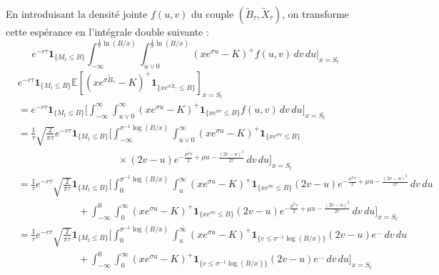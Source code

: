 \documentclass[11pt]{article}
\begin{document}
En introduisant la densité jointe $f(u, v)$ du couple $(\tilde{B}_\tau, \tilde{X}_\tau)$, on transforme cette espérance en l'intégrale double suivante :
\begin{equation}
e^{-r\tau} \mathbf{1}_{\{M_t \le B\}} \int_{-\infty}^{\frac{1}{\sigma} \ln(B/x)} \int_{u \vee 0}^{\frac{1}{\sigma} \ln(B/x)} (x e^{\sigma u} - K)^+ f(u, v) \, dv \, du \Bigg|_{x=S_t}
\end{equation}
\begin{align*}
& e^{-r\tau} \mathbf{1}_{\{M_t \le B\}} \mathbb{E} \left[ \left( x e^{\sigma \tilde{B}_\tau} - K \right)^+ \mathbf{1}_{\{ x e^{\sigma \tilde{X}_\tau} \le B \}} \right]_{x=S_t} \\
&= e^{-r\tau} \mathbf{1}_{\{M_t \le B\}} \Bigg[ \int_{-\infty}^{\infty} \int_{u \vee 0}^{\infty} (x e^{\sigma u} - K)^+ \mathbf{1}_{\{x e^{\sigma v} \le B\}} f(u, v) \, dv \, du \Bigg]_{x=S_t} \\
&= \frac{1}{\tau} \sqrt{\frac{2}{\pi\tau}} e^{-r\tau} \mathbf{1}_{\{M_t \le B\}} \Bigg[ \int_{-\infty}^{\sigma^{-1}\log(B/x)} \int_{u \vee 0}^{\infty} (x e^{\sigma u} - K)^+ \mathbf{1}_{\{x e^{\sigma v} \le B\}} \\
&\qquad \qquad \qquad \qquad \qquad \times (2v - u) e^{-\frac{\mu^2\tau}{2} + \mu u - \frac{(2v-u)^2}{2\tau}} \, dv \, du \Bigg]_{x=S_t} \\
&= \frac{1}{\tau} e^{-r\tau} \sqrt{\frac{2}{\pi\tau}} \mathbf{1}_{\{M_t \le B\}} \Bigg[ \int_{0}^{\sigma^{-1}\log(B/x)} \int_{u}^{\infty} (x e^{\sigma u} - K)^+ \mathbf{1}_{\{x e^{\sigma v} \le B\}} (2v - u) e^{-\frac{\mu^2\tau}{2} + \mu u - \frac{(2v-u)^2}{2\tau}} \, dv \, du \\
&\qquad \qquad \qquad + \int_{-\infty}^{0} \int_{0}^{\infty} (x e^{\sigma u} - K)^+ \mathbf{1}_{\{x e^{\sigma v} \le B\}} (2v - u) e^{-\frac{\mu^2\tau}{2} + \mu u - \frac{(2v-u)^2}{2\tau}} \, dv \, du \Bigg]_{x=S_t} \\
&= \frac{1}{\tau} e^{-r\tau} \sqrt{\frac{2}{\pi\tau}} \mathbf{1}_{\{M_t \le B\}} \Bigg[ \int_{0}^{\sigma^{-1}\log(B/x)} \int_{u}^{\infty} (x e^{\sigma u} - K)^+ \mathbf{1}_{\{v \le \sigma^{-1}\log(B/x)\}} (2v - u) e^{\dots} \, dv \, du \\
&\qquad \qquad \qquad + \int_{-\infty}^{0} \int_{0}^{\infty} (x e^{\sigma u} - K)^+ \mathbf{1}_{\{v \le \sigma^{-1}\log(B/x)\}} (2v - u) e^{\dots} \, dv \, du \Bigg]_{x=S_t} \\

\end{align*}
\end{document}
